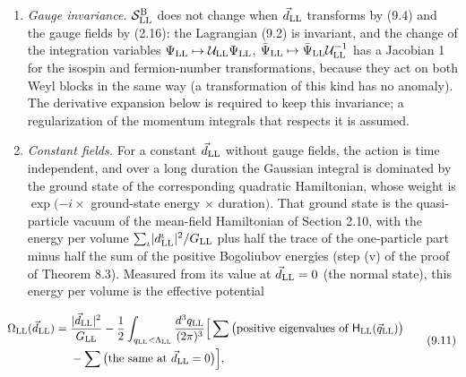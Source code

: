 \documentclass[
  10pt,
]{article}
\begin{document}
\begin{enumerate}
\def\labelenumi{(\alph{enumi})}
\item
  \emph{Gauge invariance.} \(\mathcal S^{\rm B}_{\rm LL}\) does not
  change when \(\vec d_{\rm LL}\) transforms by (9.4) and the gauge
  fields by (2.16): the Lagrangian (9.2) is invariant, and the change of
  the integration variables
  \(\Psi_{\rm LL}\mapsto\mathcal U_{\rm LL}\Psi_{\rm LL}\),
  \(\bar\Psi_{\rm LL}\mapsto\bar\Psi_{\rm LL}\mathcal U^{-1}_{\rm LL}\)
  has a Jacobian 1 for the isospin and fermion-number transformations,
  because they act on both Weyl blocks in the same way (a transformation
  of this kind has no anomaly). The derivative expansion below is
  required to keep this invariance; a regularization of the momentum
  integrals that respects it is assumed.
\item
  \emph{Constant fields.} For a constant \(\vec d_{\rm LL}\) without
  gauge fields, the action is time independent, and over a long duration
  the Gaussian integral is dominated by the ground state of the
  corresponding quadratic Hamiltonian, whose weight is \(\exp(-i\times\)
  ground-state energy \(\times\) duration\()\). That ground state is the
  quasi-particle vacuum of the mean-field Hamiltonian of Section 2.10,
  with the energy per volume
  \(\sum_\iota\lvert d^\iota_{\rm LL}\rvert^2/G_{\rm LL}\) plus half the
  trace of the one-particle part minus half the sum of the positive
  Bogoliubov energies (step (v) of the proof of Theorem 8.3). Measured
  from its value at \(\vec d_{\rm LL}=0\) (the normal state), this
  energy per volume is the effective potential
\end{enumerate}

\[\begin{aligned}\Omega_{\rm LL}(\vec d_{\rm LL})={}&\frac{\lvert\vec d_{\rm LL}\rvert^2}{G_{\rm LL}}-\frac12\int_{q_{\rm LL}<\Lambda_{\rm LL}}\frac{d^3q_{\rm LL}}{(2\pi)^3}\Big[\sum\big(\text{positive eigenvalues of }\mathsf H_{\rm LL}(\vec q_{\rm LL})\big)\\&-\sum\big(\text{the same at }\vec d_{\rm LL}=0\big)\Big],\end{aligned}\tag{9.11}\]
\end{document}
